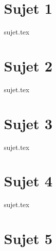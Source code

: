 \documentclass[a4paper, 11pt]{book}
\begin{document}

\chapter{Sujet 1}
\resetQ
{sujet.tex}

\chapter{Sujet 2}
\resetQ
{sujet.tex}

\chapter{Sujet 3}
\resetQ
{sujet.tex}

\chapter{Sujet 4}
\resetQ
{sujet.tex}

\chapter{Sujet 5}
\resetQ
\end{document}
